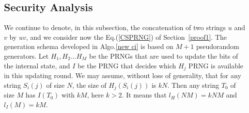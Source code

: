 \subsection{Security Analysis}
\label{Security Analysis}
We continue to denote, in this subsection, the concatenation of two strings $u$ and $v$ by $uv$,
% 
and we consider now the Eq.(\ref{CSPRNG}) of Section~\ref{proof1}.
The generation schema developed in Algo.\ref{new ci} is based on $M+1$ pseudorandom generators. Let $H_1, 
H_2 ... H_M$ be the PRNGs that are used to update the bits of the internal state,  
and $I$ be the PRNG that decides which $H_j$ PRNG is available in this updating round. 
We may assume, without loss of generality, that for any string $S_i(j)$ of size $N$,
the size of $H_j(S_i(j))$ is $kN$. 
Then any string $T_0$ of size $M$ has $I(T_0)$ with $kM$, here $k > 2$. 
It means that $l_H(NM) = kNM$ and $l_I(M) = kM$. 

